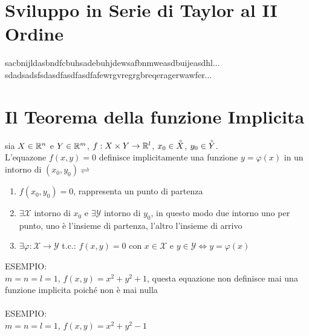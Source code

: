 \section{Sviluppo in Serie di Taylor al II Ordine}
sacbnijldasbndfcbuhsadebuhjdewsafbnmweasdbuijeasdhl...\\
sdadsadsfsdasdfasdfasdfafewrgvregrgbreqeragerwawfer...\\

\section{Il Teorema della funzione Implicita}
sia $X\in \mathbb{R}^n$ e $Y\in \mathbb{R}^m$, $f:X\times Y\to \mathbb{\mathbb{R}}^l$, $x_0\in \accentset{\circ}{X}$, $y_0\in \accentset{\circ}{Y}$.\\
L'equazone $f(x,y)=0$ definisce implicitamente una funzione $y=\varphi(x)$ in un intorno di $(x_0,y_0) \rightleftharpoons$
\begin{enumerate}
	\item $f(x_0,y_0)=0$, rappresenta un punto di partenza 
	\item $\exists \mathcal{X}$ intorno di $x_0$ e $\exists \mathcal{Y}$ intorno di $y_0$, in questo modo due intorno uno per punto, uno è l'insieme di partenza, l'altro l'insieme di arrivo
	\item $\exists\varphi:\mathcal{X}\rightarrow\mathcal{Y}$ t.c.: $f(x,y)=0$ con $x\in\mathcal{X}$ e $y\in\mathcal{Y} \Leftrightarrow y=\varphi(x)$
\end{enumerate}
ESEMPIO:\\
$m=n=l=1$, $f(x,y)=x^2+y^2+1$, questa equazione non definisce mai una funzione implicita poiché non è mai nulla\\
\\
ESEMPIO:\\
$m=n=l=1$, $f(x,y)=x^2+y^2-1$\\
	\\
